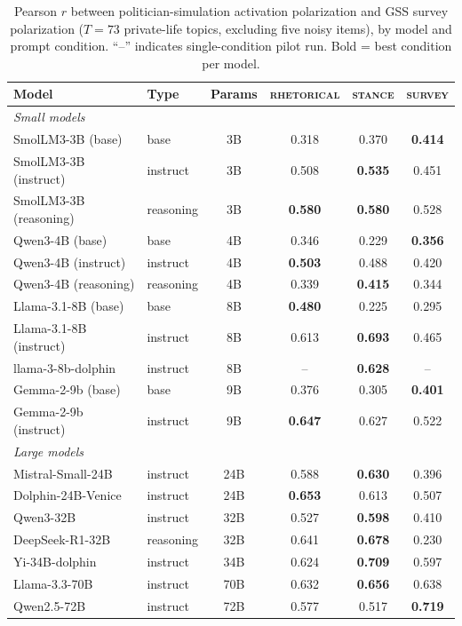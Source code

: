 \begin{table}[ht]
\centering
\small
\caption{Pearson $r$ between politician-simulation activation polarization and GSS survey polarization ($T = 73$ private-life topics, excluding five noisy items), by model and prompt condition. ``--'' indicates single-condition pilot run. Bold = best condition per model.}
\label{tab:politician_results_private}
\begin{tabular}{llcccc}
\toprule
Model & Type & Params & \textsc{rhetorical} & \textsc{stance} & \textsc{survey} \\
\midrule
\multicolumn{6}{l}{\textit{Small models}} \\
SmolLM3-3B (base)      & base      & 3B  & 0.318 & 0.370 & \textbf{0.414} \\
SmolLM3-3B (instruct)  & instruct  & 3B  & 0.508 & \textbf{0.535} & 0.451 \\
SmolLM3-3B (reasoning) & reasoning & 3B  & \textbf{0.580} & \textbf{0.580} & 0.528 \\
Qwen3-4B (base)        & base      & 4B  & 0.346 & 0.229 & \textbf{0.356} \\
Qwen3-4B (instruct)    & instruct  & 4B  & \textbf{0.503} & 0.488 & 0.420 \\
Qwen3-4B (reasoning)   & reasoning & 4B  & 0.339 & \textbf{0.415} & 0.344 \\
Llama-3.1-8B (base)    & base      & 8B  & \textbf{0.480} & 0.225 & 0.295 \\
Llama-3.1-8B (instruct)& instruct  & 8B  & 0.613 & \textbf{0.693} & 0.465 \\
llama-3-8b-dolphin     & instruct  & 8B  & -- & \textbf{0.628} & -- \\
Gemma-2-9b (base)      & base      & 9B  & 0.376 & 0.305 & \textbf{0.401} \\
Gemma-2-9b (instruct)  & instruct  & 9B  & \textbf{0.647} & 0.627 & 0.522 \\
\midrule
\multicolumn{6}{l}{\textit{Large models}} \\
Mistral-Small-24B      & instruct  & 24B & 0.588 & \textbf{0.630} & 0.396 \\
Dolphin-24B-Venice     & instruct  & 24B & \textbf{0.653} & 0.613 & 0.507 \\
Qwen3-32B              & instruct  & 32B & 0.527 & \textbf{0.598} & 0.410 \\
DeepSeek-R1-32B        & reasoning & 32B & 0.641 & \textbf{0.678} & 0.230 \\
Yi-34B-dolphin         & instruct  & 34B & 0.624 & \textbf{0.709} & 0.597 \\
Llama-3.3-70B          & instruct  & 70B & 0.632 & \textbf{0.656} & 0.638 \\
Qwen2.5-72B            & instruct  & 72B & 0.577 & 0.517 & \textbf{0.719} \\
\bottomrule
\end{tabular}
\end{table}

